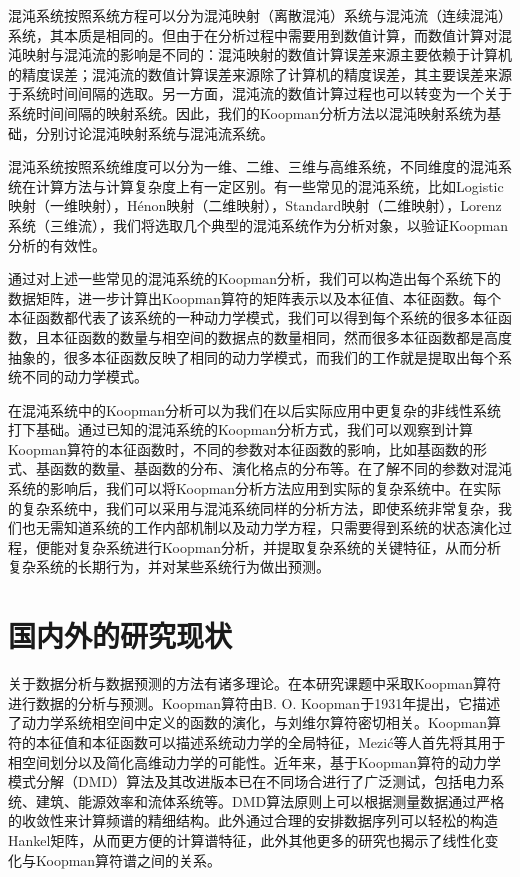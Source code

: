 混沌系统按照系统方程可以分为混沌映射（离散混沌）系统与混沌流（连续混沌）系统，其本质是相同的。但由于在分析过程中需要用到数值计算，而数值计算对混沌映射与混沌流的影响是不同的：混沌映射的数值计算误差来源主要依赖于计算机的精度误差；混沌流的数值计算误差来源除了计算机的精度误差，其主要误差来源于系统时间间隔的选取。另一方面，混沌流的数值计算过程也可以转变为一个关于系统时间间隔的映射系统。因此，我们的Koopman分析方法以混沌映射系统为基础，分别讨论混沌映射系统与混沌流系统。

混沌系统按照系统维度可以分为一维、二维、三维与高维系统，不同维度的混沌系统在计算方法与计算复杂度上有一定区别。有一些常见的混沌系统，比如Logistic映射（一维映射），H\'{e}non映射（二维映射），Standard映射（二维映射），Lorenz系统（三维流），我们将选取几个典型的混沌系统作为分析对象，以验证Koopman分析的有效性。

通过对上述一些常见的混沌系统的Koopman分析，我们可以构造出每个系统下的数据矩阵，进一步计算出Koopman算符的矩阵表示以及本征值、本征函数。每个本征函数都代表了该系统的一种动力学模式，我们可以得到每个系统的很多本征函数，且本征函数的数量与相空间的数据点的数量相同，然而很多本征函数都是高度抽象的，很多本征函数反映了相同的动力学模式，而我们的工作就是提取出每个系统不同的动力学模式。

在混沌系统中的Koopman分析可以为我们在以后实际应用中更复杂的非线性系统打下基础。通过已知的混沌系统的Koopman分析方式，我们可以观察到计算Koopman算符的本征函数时，不同的参数对本征函数的影响，比如基函数的形式、基函数的数量、基函数的分布、演化格点的分布等。在了解不同的参数对混沌系统的影响后，我们可以将Koopman分析方法应用到实际的复杂系统中。在实际的复杂系统中，我们可以采用与混沌系统同样的分析方法，即使系统非常复杂，我们也无需知道系统的工作内部机制以及动力学方程，只需要得到系统的状态演化过程，便能对复杂系统进行Koopman分析，并提取复杂系统的关键特征，从而分析复杂系统的长期行为，并对某些系统行为做出预测。

\section{国内外的研究现状}
关于数据分析与数据预测的方法有诸多理论。在本研究课题中采取Koopman算符进行数据的分析与预测。Koopman算符由B. O. Koopman于1931年提出，它描述了动力学系统相空间中定义的函数的演化，与刘维尔算符密切相关。Koopman算符的本征值和本征函数可以描述系统动力学的全局特征，Mezi\'{c}等人首先将其用于相空间划分以及简化高维动力学的可能性。近年来，基于Koopman算符的动力学模式分解（DMD）算法及其改进版本已在不同场合进行了广泛测试，包括电力系统、建筑、能源效率和流体系统等。DMD算法原则上可以根据测量数据通过严格的收敛性来计算频谱的精细结构。此外通过合理的安排数据序列可以轻松的构造Hankel矩阵，从而更方便的计算谱特征，此外其他更多的研究也揭示了线性化变化与Koopman算符谱之间的关系。

